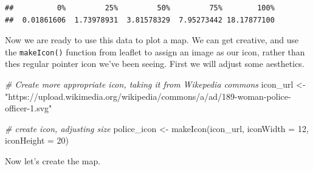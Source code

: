 \documentclass[
]{book}
\makeatletter
\newenvironment{Shaded}{\begin{snugshade}}{\end{snugshade}}
\newcommand{\AttributeTok}[1]{\textcolor[rgb]{0.61,0.61,0.61}{#1}}
\newcommand{\CommentTok}[1]{\textcolor[rgb]{0.37,0.37,0.37}{\textit{#1}}}
\newcommand{\ConstantTok}[1]{\textcolor[rgb]{0,0,0}{#1}}
\newcommand{\DecValTok}[1]{\textcolor[rgb]{0.06,0.06,0.06}{#1}}
\newcommand{\FloatTok}[1]{\textcolor[rgb]{0.06,0.06,0.06}{#1}}
\newcommand{\FunctionTok}[1]{\textcolor[rgb]{0,0,0}{#1}}
\newcommand{\NormalTok}[1]{#1}
\newcommand{\OtherTok}[1]{\textcolor[rgb]{0.37,0.37,0.37}{#1}}
\newcommand{\SpecialCharTok}[1]{\textcolor[rgb]{0,0,0}{#1}}
\newcommand{\StringTok}[1]{\textcolor[rgb]{0.5,0.5,0.5}{#1}}
\newenvironment{kframe}{%
\medskip{}
\setlength{\fboxsep}{.8em}
 \def\at@end@of@kframe{}%
 \ifinner\ifhmode%
  \def\at@end@of@kframe{\end{minipage}}%
  \begin{minipage}{\columnwidth}%
 \fi\fi%
 \def\FrameCommand##1{\hskip\@totalleftmargin \hskip-\fboxsep
 \colorbox{shadecolor}{##1}\hskip-\fboxsep
     \hskip-\linewidth \hskip-\@totalleftmargin \hskip\columnwidth}%
 \MakeFramed {\advance\hsize-\width
   \@totalleftmargin\z@ \linewidth\hsize
   \@setminipage}}%
 {\par\unskip\endMakeFramed%
 \at@end@of@kframe}
\renewenvironment{Shaded}{\begin{kframe}}{\end{kframe}}
\makeatother
\begin{document}
\begin{verbatim}
##          0%         25%         50%         75%        100% 
##  0.01861606  1.73978931  3.81578329  7.95273442 18.17877100
\end{verbatim}

Now we are ready to use this data to plot a map. We can get creative, and use the \texttt{makeIcon()} function from leaflet to assign an image as our icon, rather than thes regular pointer icon we've been seeing. First we will adjust some aesthetics.

\begin{Shaded}
\begin{Highlighting}[]
\CommentTok{\# Create more appropriate icon, taking it from Wikepedia commons }
\NormalTok{icon\_url }\OtherTok{\textless{}{-}} \StringTok{"https://upload.wikimedia.org/wikipedia/commons/a/ad/189{-}woman{-}police{-}officer{-}1.svg"}

\CommentTok{\# create icon, adjusting size }
\NormalTok{police\_icon }\OtherTok{\textless{}{-}} \FunctionTok{makeIcon}\NormalTok{(icon\_url,}
                        \AttributeTok{iconWidth =} \DecValTok{12}\NormalTok{, }
                        \AttributeTok{iconHeight =} \DecValTok{20}\NormalTok{)}
\end{Highlighting}
\end{Shaded}

\begin{Shaded}
\end{Shaded}

Now let's create the map.
\end{document}
